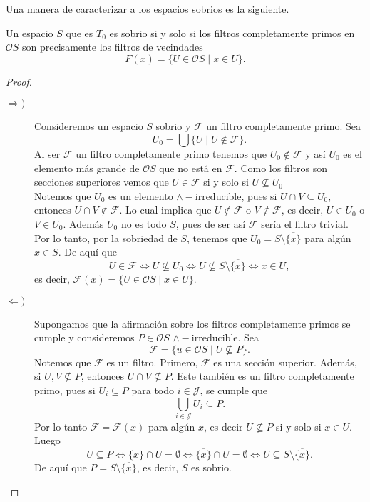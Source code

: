 \documentclass{comunicaciones}
\begin{document}
Una manera de caracterizar a los espacios sobrios es la siguiente.

\begin{thm}\label{Fprimo}
Un espacio $S$ que es $T_0$ es sobrio si y solo si los filtros completamente primos en $\mathcal{O}S$ son precisamente los filtros de vecindades
\[
F(x)=\{U\in \mathcal{O}S\mid x\in U\}.
\]
\end{thm}

\begin{proof}
\begin{description}
    \item[$\Rightarrow )$] Consideremos un espacio $S$ sobrio y $\mathcal{F}$ un filtro completamente primo. Sea 
    \[
    U_0=\bigcup\{U\mid U\notin \mathcal{F}\}.
    \]
    Al ser $\mathcal{F}$ un filtro completamente primo tenemos que $U_0\notin \mathcal{F}$ y así $U_0$ es el elemento más grande de $\mathcal{O}S$ que no está en $\mathcal{F}$. Como los filtros son secciones superiores vemos que $U\in \mathcal{F}$ si y solo si $U\nsubseteq U_0$\\

    \noindent
    Notemos que $U_0$ es un elemento $\wedge-$irreducible, pues si $U\cap V\subseteq U_0$, entonces $U\cap V\notin \mathcal{F}$. Lo cual implica que $U\notin\mathcal{F}$ o $V\notin\mathcal{F}$, es decir, $U\in U_0$ o $V\in U_0$. Además $U_0$ no es todo $S$, pues de ser así $\mathcal{F}$ sería el filtro trivial.\\

    \noindent
    Por lo tanto, por la sobriedad de $S$, tenemos que $U_0=S\setminus \overline{\{x\}}$ para algún $x\in S$. De aquí que 
    \[
    U\in \mathcal{F}\Leftrightarrow U\nsubseteq U_0\Leftrightarrow U\nsubseteq S\setminus \overline{\{x\}}\Leftrightarrow x\in U,
    \]
    es decir, $\mathcal{F}(x)=\{U\in\mathcal{O}S\mid x\in U\}$.
    \item[$\Leftarrow )$] Supongamos que la afirmación sobre los filtros completamente primos se cumple y consideremos $P\in\mathcal{O}S$ $\wedge-$irreducible. Sea 
    \[
    \mathcal{F}=\{u\in \mathcal{O}S\mid U\nsubseteq P\}.
    \]
    Notemos que $\mathcal{F}$ es un filtro. Primero, $\mathcal{F}$ es una sección superior. Además, si $U, V\nsubseteq P$, entonces $U\cap V\nsubseteq P$. Este también es un filtro completamente primo, pues si $U_i\subseteq P$ para todo $i\in \mathcal{J}$, se cumple que 
    \[
    \bigcup_{i\in\mathcal{J}}U_i\subseteq P.
    \]
    Por lo tanto $\mathcal{F}=\mathcal{F}(x)$ para algún $x$, es decir $U\nsubseteq P$ si y solo si $x\in U$. Luego
    \[
    U\subseteq P\Leftrightarrow \{x\}\cap U=\emptyset\Leftrightarrow \overline{\{x\}}\cap U=\emptyset\Leftrightarrow U\subseteq S\setminus \overline{\{x\}}.
    \]
    De aquí que $P=S\setminus \overline{\{x\}}$, es decir, $S$ es sobrio.
\end{description}    
\end{proof}
\end{document}
